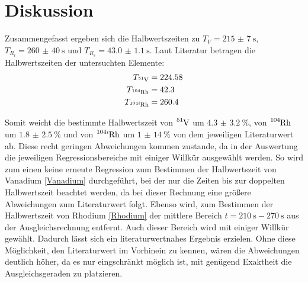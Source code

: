 \section{Diskussion}
\label{sec:Diskussion}

Zusammengefasst ergeben sich die Halbwertszeiten zu $T_V=\SI{215(7)}{\s}$, $T_{R_l}=\SI{260(40)}{\s}$ und $T_{R_s}=\SI{43.0(11)}{\s}$. Laut Literatur \cite{JLab} betragen die Halbwertszeiten der untersuchten Elemente:
\begin{align*}
    T_{\ce{^{51}V}}&=224.58  \\
    T_{\ce{^{104}Rh}}&=42.3  \\
    T_{\ce{^{104i}Rh}}&=260.4
\end{align*}

Somit weicht die bestimmte Halbwertszeit von $\ce{^{51}V}$ um $\SI{4.3(32)}{\percent}$, von $\ce{^{104}Rh}$ um $\SI{1.8(25)}{\percent}$ und von $\ce{^{104i}Rh}$ um $\SI{1(14)}{\percent}$ von dem jeweiligen Literaturwert ab. Diese recht geringen Abweichungen kommen zustande, da in der Auswertung die jeweiligen Regressionsbereiche mit einiger Willkür ausgewählt werden. So wird zum einen keine erneute Regression zum Bestimmen der Halbwertszeit von Vanadium \ref{Vanadium} durchgeführt, bei der nur die Zeiten bis zur doppelten Halbwertszeit beachtet werden, da bei dieser Rechnung eine größere Abweichungen zum Literaturwert folgt. Ebenso wird, zum Bestimmen der Halbwertszeit von Rhodium \ref{Rhodium} der mittlere Bereich $t=\SI{210}{\s}-\SI{270}{\s}$ aus der Ausgleichsrechnung entfernt. Auch dieser Bereich wird mit einiger Willkür gewählt. Dadurch lässt sich ein literaturwertnahes Ergebnis erzielen. Ohne diese Möglichkeit, den Literaturwert im Vorhinein zu kennen, wären die Abweichungen deutlich höher, da es nur eingschränkt möglich ist, mit genügend Exaktheit die Ausgleichsgeraden zu platzieren.  




